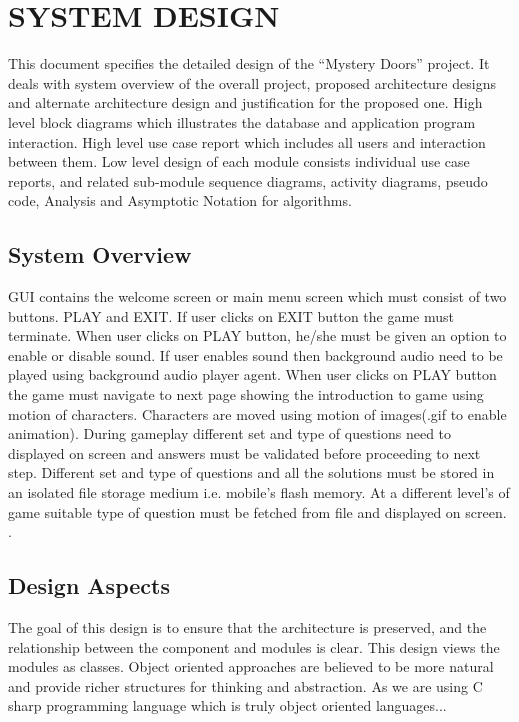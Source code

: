 \chapter{SYSTEM DESIGN}

This document specifies the detailed design of the “Mystery Doors” project.  It deals  with  system  overview  of  the  overall  project,  proposed  architecture  designs  and alternate  architecture  design  and  justification  for  the  proposed  one.  High  level  block diagrams which  illustrates  the  database  and  application  program  interaction. High level use case report which includes all users and interaction between them. Low level design of each module consists individual use case reports, and related sub-module sequence diagrams, activity diagrams, pseudo code, Analysis and Asymptotic Notation for algorithms.

\section{System Overview}
\hspace{1cm}GUI contains the welcome screen or main menu screen which must consist of two buttons. PLAY and EXIT. If user clicks on EXIT button the game must terminate. When user clicks on PLAY button, he/she must be given an option to enable or disable sound. If user enables sound then background audio need to be played using background audio player agent. 
When user clicks on PLAY button the game must navigate to next page showing the introduction to game using motion of characters. Characters are moved using motion of images(.gif to enable animation). During gameplay different set and type of questions need to displayed on screen and answers must be validated before proceeding to next step. Different set and type of questions and all the solutions must be stored in an isolated file storage medium i.e. mobile’s flash memory. At a different level’s of game suitable type of question must be fetched from file and displayed on screen.
\cite{DBLP:journals/ivc/KadyrovP03}.\\

\section{Design Aspects}
\hspace{1cm}
                            The goal of this design is to ensure that the architecture is preserved, and the relationship between the component and modules is clear.  This design views the modules as classes. Object oriented approaches are believed to be more natural and provide richer structures for thinking and abstraction. As we are using C sharp  programming language which is truly object oriented languages..\cite{DBLP:journals/ivc/KadyrovP03}.\\

